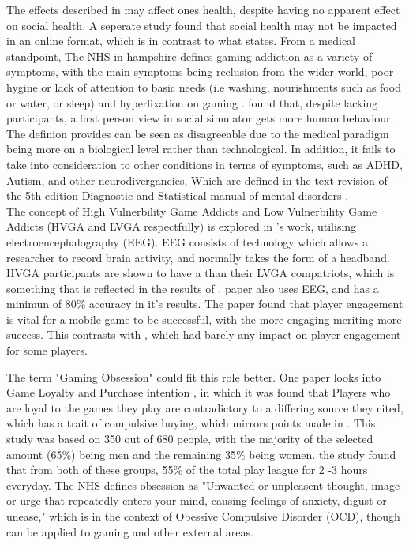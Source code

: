 \documentclass[conference]{IEEEtran}
\begin{document}
The effects described in \cite{Rahman2021} may affect ones health, despite having no apparent effect on social health. A seperate study \cite{Schlagowski2024} found that social health may not be impacted in an online format, which is in contrast to what \cite{NHSHamp24} states. From a medical standpoint, The NHS in hampshire defines gaming addiction as a variety of symptoms, with the main symptoms being reclusion from the wider world, poor hygine or lack of attention to basic needs (i.e washing, nourishments such as food or water, or sleep) and hyperfixation on gaming \cite{NHSHamp24}. \cite{Schlagowski2024} found that, despite lacking participants, a first person view in social simulator gets more human behaviour. The definion \cite{NHSHamp24} provides can be seen as disagreeable due to the medical paradigm being more on a biological level rather than technological. In addition, it fails to take into consideration to other conditions in terms of symptoms, such as ADHD, Autism, and other neurodivergancies, Which are defined in the text revision of the 5th edition Diagnostic and Statistical manual of mental disorders \cite{Association2022}.\\

The concept of High Vulnerbility Game Addicts and Low Vulnerbility Game Addicts (HVGA and LVGA respectfully) is explored in \cite{Jing2024}'s work, utilising electroencephalography (EEG). EEG consists of technology which allows a researcher to record brain activity, and normally takes the form of a headband. HVGA participants are shown to have a than their LVGA compatriots, which is something that is reflected in the results of \cite{Naaj2021}. \cite{Ruqeyya2022} paper also uses EEG, and has a minimun of 80\%  accuracy in it's results. The paper found that player engagement is vital for a mobile game to be successful, with the more engaging meriting more success. This contrasts with \cite{Schlagowski2024}, which had barely any impact on player engagement for some players.

The term "Gaming Obsession" could fit this role better. One paper looks into Game Loyalty and Purchase intention \cite{Ramli2022}, in which it was found that Players who are loyal to the games they play are contradictory to a differing source they cited\cite{Widodo2020}, which has a trait of compulsive buying, which mirrors points made in \cite{yasir2021}.  This study was based on 350 out of 680 people, with the majority of the selected amount (65\%) being men and the remaining 35\% being women. the study found that from both of these groups, 55\% of the total play league for 2 -3 hours everyday. The NHS  \cite{NHS2021} defines obsession as "Unwanted or unpleasent thought, image or urge that repeatedly enters your mind, causing feelings of anxiety, digust or unease," which is in the context of Obessive Compulsive Disorder (OCD), though can be applied to gaming and other external areas.\\
\end{document}
